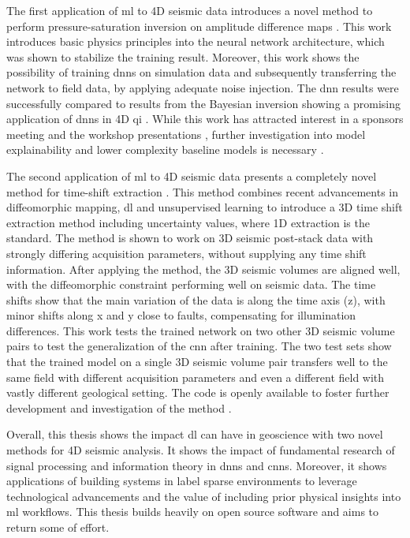 The first application of \acl{ml} to 4D seismic data introduces a novel method to perform pressure-saturation inversion on amplitude difference maps \citep{dramsch2019deep}. This work introduces basic physics principles into the neural network architecture, which was shown to stabilize the training result. Moreover, this work shows the possibility of training \aclp{dnn} on simulation data and subsequently transferring the network to field data, by applying adequate noise injection. The \acl{dnn} results were successfully compared to results from the Bayesian inversion showing a promising application of \aclp{dnn} in 4D \acl{qi} \citep{dramsch2019deep}. While this work has attracted interest in a sponsors meeting and the workshop presentations \citep{dramsch2019deep,dramsch2019including}, further investigation into model explainability and lower complexity baseline models is necessary \citep[in preparation][]{corte2019exploring,dramsch2020physics}.

The second application of \acl{ml} to 4D seismic data presents a completely novel method for time-shift extraction \citep{dramsch20193dwarping}. This method combines recent advancements in diffeomorphic mapping, \acl{dl} and unsupervised learning to introduce a 3D time shift extraction method including uncertainty values, where 1D extraction is the standard. The method is shown to work on 3D seismic post-stack data with strongly differing acquisition parameters, without supplying any time shift information. After applying the method, the 3D seismic volumes are aligned well, with the diffeomorphic constraint performing well on seismic data. The time shifts show that the main variation of the data is along the time axis (z), with minor shifts along x and y close to faults, compensating for illumination differences. This work tests the trained network on two other 3D seismic volume pairs to test the generalization of the \ac{cnn} after training. The two test sets show that the trained model on a single 3D seismic volume pair transfers well to the same field with different acquisition parameters and even a different field with vastly different geological setting. The code is openly available to foster further development and investigation of the method \citep{dramsch20203dwarpingcode}.

Overall, this thesis shows the impact \acl{dl} can have in geoscience with two novel methods for 4D seismic analysis. It shows the impact of fundamental research of signal processing and information theory in \aclp{dnn} and \aclp{cnn}. Moreover, it shows applications of building systems in label sparse environments to leverage technological advancements and the value of including prior physical insights into \acl{ml} workflows. This thesis builds heavily on open source software and aims to return some of effort.